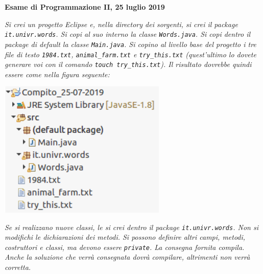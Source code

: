 \documentclass[12pt]{article}
\begin{document}
\begin{center} {\bf Esame di Programmazione II, 25 luglio 2019}\end{center}

\emph{
Si crei un progetto Eclipse e, nella directory dei sorgenti,
si crei il package \texttt{it.univr.words}. Si copi al suo interno
la classe \texttt{Words.java}. Si copi dentro il package di default la classe
\texttt{Main.java}. Si copino al livello base del progetto i tre file di testo
\texttt{1984.txt}, \texttt{animal\_farm.txt} e \texttt{try\_this.txt} (quest'ultimo lo
dovete generare voi con il comando \texttt{touch try\_this.txt}).
Il risultato dovrebbe quindi essere come nella figura seguente:}

\begin{center}
\includegraphics[width=8cm]{project.png}
\end{center}

\emph{
Se si realizzano nuove classi, le si crei dentro
il package \texttt{it.univr.words}.
Non si modifichi le dichiarazioni dei metodi. Si possono definire altri campi,
metodi, costruttori e classi, ma devono essere \texttt{private}.
La consegna fornita compila.
Anche la soluzione che verr\`a consegnata dovr\`a compilare,
altrimenti non verr\`a corretta.
}
\mbox{}\\
\end{document}
